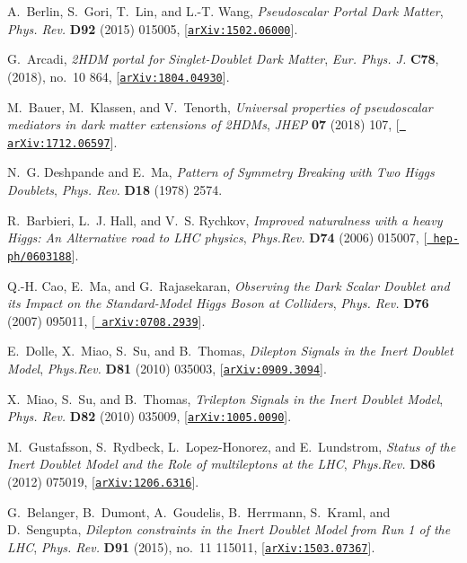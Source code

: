 \documentclass[review]{elsarticle}
\begin{document}
\begin{thebibliography}{100}
A.~Berlin, S.~Gori, T.~Lin, and L.-T. Wang, {\it {Pseudoscalar Portal Dark
  Matter}},  {\em Phys. Rev.} {\bf D92} (2015) 015005,
  [\href{http://arxiv.org/abs/1502.06000}{{\tt arXiv:1502.06000}}].

G.~Arcadi, {\it {2HDM portal for Singlet-Doublet Dark Matter}},
{\em Eur. Phys.  J.} {\bf C78}, (2018), no.~10  864, 
[\href{http://arxiv.org/abs/1804.04930}{{\tt arXiv:1804.04930}}].

M.~Bauer, M.~Klassen, and V.~Tenorth, {\it {Universal properties of
  pseudoscalar mediators in dark matter extensions of 2HDMs}},  {\em JHEP} {\bf
  07} (2018) 107, [\href{http://arxiv.org/abs/1712.06597}{{\tt
  arXiv:1712.06597}}].

N.~G. Deshpande and E.~Ma, {\it {Pattern of Symmetry Breaking with Two Higgs
  Doublets}},  {\em Phys. Rev.} {\bf D18} (1978) 2574.

R.~Barbieri, L.~J. Hall, and V.~S. Rychkov, {\it {Improved naturalness with a
  heavy Higgs: An Alternative road to LHC physics}},  {\em Phys.Rev.} {\bf D74}
  (2006) 015007, [\href{http://arxiv.org/abs/hep-ph/0603188}{{\tt
  hep-ph/0603188}}].

Q.-H. Cao, E.~Ma, and G.~Rajasekaran, {\it {Observing the Dark Scalar Doublet
  and its Impact on the Standard-Model Higgs Boson at Colliders}},  {\em Phys.
  Rev.} {\bf D76} (2007) 095011, [\href{http://arxiv.org/abs/0708.2939}{{\tt
  arXiv:0708.2939}}].

E.~Dolle, X.~Miao, S.~Su, and B.~Thomas, {\it {Dilepton Signals in the Inert
  Doublet Model}},  {\em Phys.Rev.} {\bf D81} (2010) 035003,
  [\href{http://arxiv.org/abs/0909.3094}{{\tt arXiv:0909.3094}}].

X.~Miao, S.~Su, and B.~Thomas, {\it {Trilepton Signals in the Inert Doublet
  Model}},  {\em Phys. Rev.} {\bf D82} (2010) 035009,
  [\href{http://arxiv.org/abs/1005.0090}{{\tt arXiv:1005.0090}}].

M.~Gustafsson, S.~Rydbeck, L.~Lopez-Honorez, and E.~Lundstrom, {\it {Status of
  the Inert Doublet Model and the Role of multileptons at the LHC}},  {\em
  Phys.Rev.} {\bf D86} (2012) 075019,
  [\href{http://arxiv.org/abs/1206.6316}{{\tt arXiv:1206.6316}}].

G.~Belanger, B.~Dumont, A.~Goudelis, B.~Herrmann, S.~Kraml, and D.~Sengupta,
  {\it {Dilepton constraints in the Inert Doublet Model from Run 1 of the
  LHC}},  {\em Phys. Rev.} {\bf D91} (2015), no.~11 115011,
  [\href{http://arxiv.org/abs/1503.07367}{{\tt arXiv:1503.07367}}].


\end{thebibliography}
\end{document}
